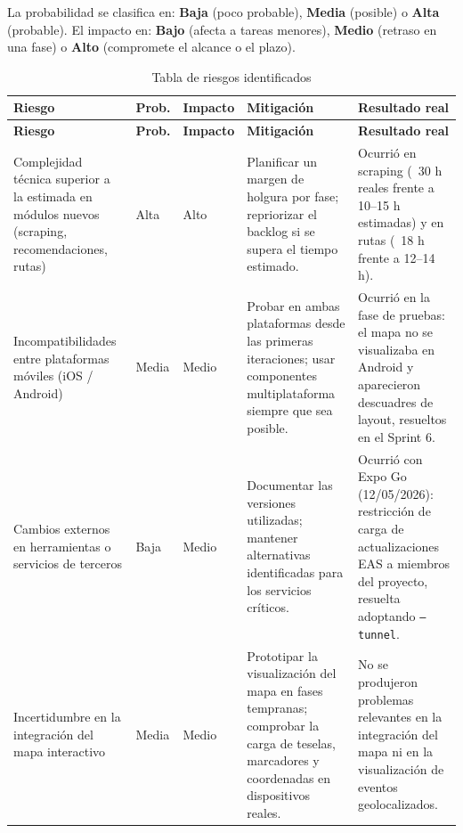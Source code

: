 La probabilidad se clasifica en: \textbf{Baja} (poco probable), \textbf{Media} (posible) o \textbf{Alta} (probable). El impacto en: \textbf{Bajo} (afecta a tareas menores), \textbf{Medio} (retraso en una fase) o \textbf{Alto} (compromete el alcance o el plazo).

\begin{longtable}{
>{\raggedright\arraybackslash}p{3.5cm}
>{\raggedright\arraybackslash}p{1.5cm}
>{\raggedright\arraybackslash}p{1.5cm}
>{\raggedright\arraybackslash}p{4.5cm}
>{\raggedright\arraybackslash}p{3.5cm}}
\caption{Tabla de riesgos identificados}\label{tab:riesgos}\\
\toprule
\textbf{Riesgo} & \textbf{Prob.} & \textbf{Impacto} & \textbf{Mitigación} & \textbf{Resultado real} \\
\midrule
\endfirsthead
\toprule
\textbf{Riesgo} & \textbf{Prob.} & \textbf{Impacto} & \textbf{Mitigación} & \textbf{Resultado real} \\
\midrule
\endhead
\bottomrule
\endlastfoot

Complejidad técnica superior a la estimada en módulos nuevos (scraping, recomendaciones, rutas) &
Alta & Alto &
Planificar un margen de holgura por fase; repriorizar el backlog si se supera el tiempo estimado. &
Ocurrió en scraping (~30 h reales frente a 10--15 h estimadas) y en rutas (~18 h frente a 12--14 h). \\
\midrule

Incompatibilidades entre plataformas móviles (iOS / Android) &
Media & Medio &
Probar en ambas plataformas desde las primeras iteraciones; usar componentes multiplataforma siempre que sea posible. &
Ocurrió en la fase de pruebas: el mapa no se visualizaba en Android y aparecieron descuadres de layout, resueltos en el Sprint 6. \\
\midrule

Cambios externos en herramientas o servicios de terceros &
Baja & Medio &
Documentar las versiones utilizadas; mantener alternativas identificadas para los servicios críticos. &
Ocurrió con Expo Go (12/05/2026): restricción de carga de actualizaciones EAS a miembros del proyecto, resuelta adoptando \texttt{--tunnel}. \\
\midrule

Incertidumbre en la integración del mapa interactivo &
Media & Medio &
Prototipar la visualización del mapa en fases tempranas; comprobar la carga de teselas, marcadores y coordenadas en dispositivos reales. &
No se produjeron problemas relevantes en la integración del mapa ni en la visualización de eventos geolocalizados. \\
\midrule


\end{longtable}
